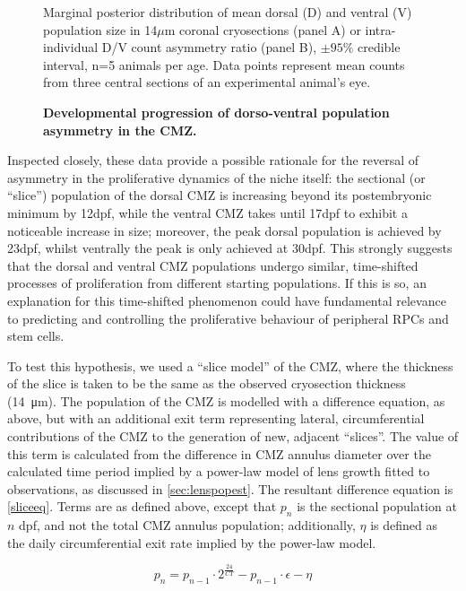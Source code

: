 \begin{figure}[!h]
    \caption{{\bf Developmental progression of dorso-ventral population asymmetry in the CMZ.}}
    Marginal posterior distribution of mean dorsal (D) and ventral (V) population size in 14$\mu$m coronal cryosections (panel A) or intra-individual D/V count asymmetry ratio (panel B), $\pm 95\%$ credible interval, n=5 animals per age. Data points represent mean counts from three central sections of an experimental animal's eye. 
    \label{DVontology}
\end{figure}

Inspected closely, these data provide a possible rationale for the reversal of asymmetry in the proliferative dynamics of the niche itself: the sectional (or ``slice'') population of the dorsal CMZ is increasing beyond its postembryonic minimum by 12dpf, while the ventral CMZ takes until 17dpf to exhibit a noticeable increase in size; moreover, the peak dorsal population is achieved by 23dpf, whilst ventrally the peak is only achieved at 30dpf. This strongly suggests that the dorsal and ventral CMZ populations undergo similar, time-shifted processes of proliferation from different starting populations. If this is so, an explanation for this time-shifted phenomenon could have fundamental relevance to predicting and controlling the proliferative behaviour of peripheral RPCs and stem cells.

To test this hypothesis, we used a ``slice model'' of the CMZ, where the thickness of the slice is taken to be the same as the observed cryosection thickness (\SI{14}{\micro\metre}). The population of the CMZ is modelled with a difference equation, as above, but with an additional exit term representing lateral, circumferential contributions of the CMZ to the generation of new, adjacent ``slices''. The value of this term is calculated from the difference in CMZ annulus diameter over the calculated time period implied by a power-law model of lens growth fitted to observations, as discussed in \autoref{sec:lenspopest}. The resultant difference equation is \autoref{sliceeq}. Terms are as defined above, except that $p_n$ is the sectional population at $n$ dpf, and not the total CMZ annulus population; additionally, $\eta$ is defined as the daily circumferential exit rate implied by the power-law model.

\begin{equation}
    p_n=p_{n-1} \cdot 2^{\frac{24}{CT}} - p_{n-1} \cdot \epsilon - \eta
    \label{sliceeq}
\end{equation}

